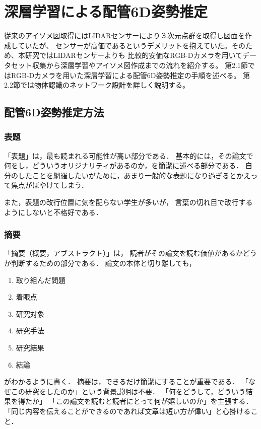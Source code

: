 \chapter{%
深層学習による配管6D姿勢推定}

従来のアイソメ図取得にはLIDARセンサーにより３次元点群を取得し図面を作成していたが、
センサーが高価であるというデメリットを抱えていた。そのため、本研究ではLIDARセンサーよりも
比較的安価なRGB-Dカメラを用いてデータセット収集から深層学習やアイソメ図作成までの流れを紹介する。
第2.1節ではRGB-Dカメラを用いた深層学習による配管6D姿勢推定の手順を述べる。
第2.2節では物体認識のネットワーク設計を詳しく説明する。


\section{配管6D姿勢推定方法}


\subsection{表題}

「表題」は，最も読まれる可能性が高い部分である．
基本的には，その論文で何をし，どういうオリジナリティがあるのか，を簡潔に述べる部分である．
自分のしたことを網羅したいがために，あまり一般的な表題になり過ぎるとかえって焦点がぼやけてしまう．

また，表題の改行位置に気を配らない学生が多いが，
言葉の切れ目で改行するようにしないと不格好である．


\subsection{摘要}

「摘要（概要，アブストラクト）」は，
読者がその論文を読む価値があるかどうか判断するための部分である．
論文の本体と切り離しても，
\begin{enumerate}
	\item 取り組んだ問題
	\item 着眼点
	\item 研究対象
	\item 研究手法
	\item 研究結果
	\item 結論
\end{enumerate}
がわかるように書く．
摘要は，できるだけ簡潔にすることが重要である．
「なぜこの研究をしたのか」という背景説明は不要．
「何をどうして，どういう結果を得たか」
「この論文を読むと読者にとって何が嬉しいのか」を主張する．
「同じ内容を伝えることができるのであれば文章は短い方が偉い」と心掛けること．


